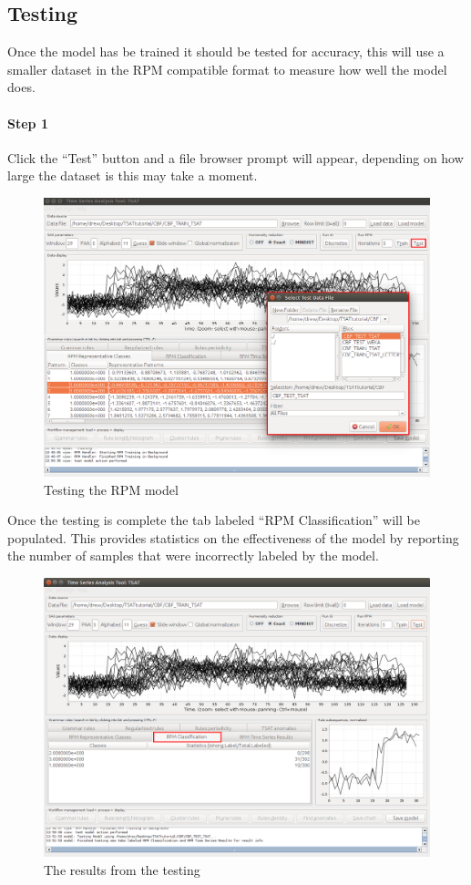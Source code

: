 \documentclass[titlepage, letterpaper, 12pt]{article}
\begin{document}
\subsection{Testing}
\label{RPMTest}
Once the model has be trained it should be tested for accuracy, this will use a smaller dataset in the RPM compatible format to measure how well the model does. 

\paragraph{Step 1}
Click the ``Test'' button and a file browser prompt will appear, depending on how large the dataset is this may take a moment. 

\begin{figure}[H]
	\includegraphics[width=\textwidth]{TSAT-testing-step-1}
	\caption{Testing the RPM model}
	\label{fig:TSAT-testing-step-1}
\end{figure}

\newpage
Once the testing is complete the tab labeled ``RPM Classification'' will be populated. This provides statistics on the effectiveness of the model by reporting the number of samples that were incorrectly labeled by the model.

\begin{figure}[H]
	\includegraphics[width=\textwidth]{TSAT-testing-step-2}
	\caption{The results from the testing}
	\label{fig:TSAT-testing-step-2}
\end{figure}
\end{document}
